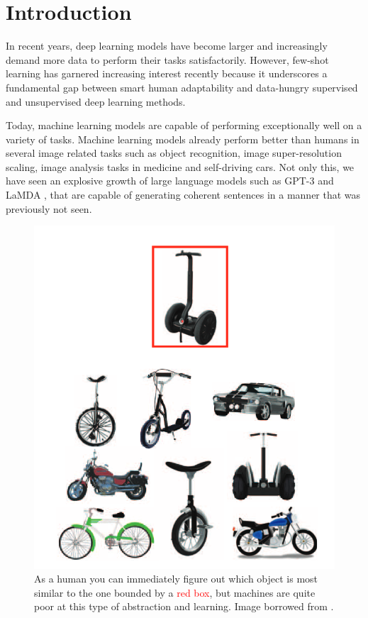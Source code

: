 \chapter{Introduction}\label{sec:intro}

In recent years, deep learning models have become larger and increasingly demand more data to perform their tasks satisfactorily. 
However, few-shot learning has garnered increasing interest recently because it underscores a fundamental gap between smart human adaptability and data-hungry supervised and unsupervised deep learning methods.

Today, machine learning models are capable of performing exceptionally well on a variety of tasks. Machine learning models already perform better than humans in several image related tasks such as object recognition, image super-resolution scaling, image analysis tasks in medicine and self-driving cars. Not only this, we have seen an explosive growth of large language models such as GPT-3 \parencite{brown2020language} and LaMDA \parencite{cohen2022lamda}, that are capable of generating coherent sentences in a manner that was previously not seen.
\begin{figure}[ht]
    \centering
    \includegraphics[scale=0.25]{chapters/assets/human-understanding.png}
    \caption{As a human you can immediately figure out which object is most similar to the one bounded by a \textcolor{red}{red box}, but machines are quite poor at this type of abstraction and learning. Image borrowed from \parencite{Lake2015Human-levelInduction}.}
    \label{fig:human-understanding}
\end{figure}

